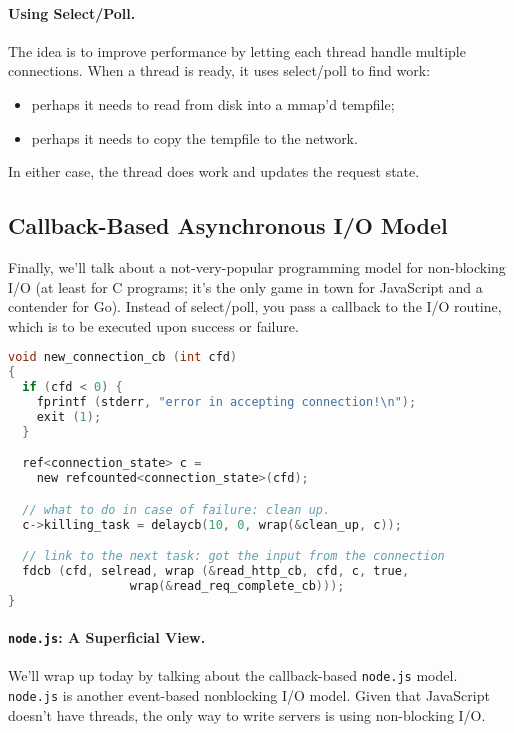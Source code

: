 \documentclass[11pt]{article}
\newenvironment{itemizep}{
 \begin{itemize}
  \setlength{\itemsep}{0pt}
  \setlength{\parsep}{3pt}
  \setlength{\topsep}{3pt}
  \setlength{\partopsep}{0pt}
  \setlength{\leftmargin}{1.5em}
  \setlength{\labelwidth}{1em}
  \setlength{\labelsep}{0.5em} }
 {\end{itemize}}
\begin{document}
\paragraph{Using Select/Poll.} The idea is to improve performance
by letting each thread handle multiple connections.
When a thread is ready, it uses select/poll to find work:
    \begin{itemizep}
      \item perhaps it needs to read from disk into a mmap'd tempfile;
      \item perhaps it needs to copy the tempfile to the network.
    \end{itemizep}

In either case, the thread does work and updates the request state.

\subsection*{Callback-Based Asynchronous I/O Model}
Finally, we'll talk about a not-very-popular programming model for
non-blocking I/O (at least for C programs; it's the only game in town
for JavaScript and a contender for Go).  Instead of select/poll, you
pass a callback to the I/O routine, which is to be executed upon
success or failure.

\begin{lstlisting}[language=C]
void new_connection_cb (int cfd)
{
  if (cfd < 0) {
    fprintf (stderr, "error in accepting connection!\n");
    exit (1);
  }

  ref<connection_state> c = 
    new refcounted<connection_state>(cfd);

  // what to do in case of failure: clean up.
  c->killing_task = delaycb(10, 0, wrap(&clean_up, c));

  // link to the next task: got the input from the connection
  fdcb (cfd, selread, wrap (&read_http_cb, cfd, c, true,
                 wrap(&read_req_complete_cb)));
}
\end{lstlisting}


\paragraph{{\tt node.js}: A Superficial View.} We'll wrap up today 
by talking about the callback-based {\tt node.js} model.
{\tt node.js} is another event-based nonblocking I/O model.
Given that JavaScript doesn't have threads, the only way to write servers
is using non-blocking I/O.
\end{document}
